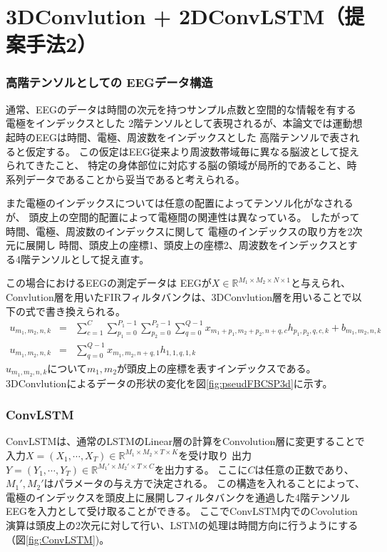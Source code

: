 \section{\rm 3DConvlution + 2DConvLSTM\mc （提案手法2）}
\subsubsection{\mc 高階テンソルとしての \rm EEG\mc データ構造}
通常、EEGのデータは時間の次元を持つサンプル点数と空間的な情報を有する電極をインデックスとした
2階テンソルとして表現されるが、本論文では運動想起時のEEGは時間、電極、周波数をインデックスとした
高階テンソルで表されると仮定する。
この仮定はEEG従来より周波数帯域毎に異なる脳波として捉えられてきたこと、
特定の身体部位に対応する脳の領域が局所的であること、時系列データであることから妥当であると考えられる。

また電極のインデックスについては任意の配置によってテンソル化がなされるが、
頭皮上の空間的配置によって電極間の関連性は異なっている。
したがって時間、電極、周波数のインデックスに関して
電極のインデックスの取り方を2次元に展開し
時間、頭皮上の座標1、頭皮上の座標2、周波数をインデックスとする4階テンソルとして捉え直す。

この場合におけるEEGの測定データは
EEGが\(X\in \mathbb R^{M_1\times M_2\times N\times 1}\)と与えられ、
Convlution層を用いたFIRフィルタバンクは、3DConvlution層を用いることで以下の式で書き換えられる。
\begin{eqnarray}
    u_{m_1,m_2,n,k}& = &\sum_{c=1}^C\sum_{p_1=0}^{P_1-1}\sum_{p_2=0}^{P_2-1}\sum_{q=0}^{Q-1} x_{m_1+p_1,m_2+p_2,n+q,c} h_{p_1,p_2,q,c,k} + b_{m_1,m_2,n,k}\\
    u_{m_1,m_2,n,k}& = &\sum_{q=0}^{Q-1} x_{m_1,m_2,n+q,1} h_{1,1,q,1,k}
    \label{eq:pseudoFIR3D}
\end{eqnarray} 
\(u_{m_1,m_2,n,k}\)について\(m_1,m_2\)が頭皮上の座標を表すインデックスである。
3DConvlutionによるデータの形状の変化を図\ref{fig:pseudFBCSP3d}に示す。


\subsubsection{\rm ConvLSTM}
ConvLSTMは、通常のLSTMのLinear層の計算をConvolution層に変更することで
入力\(X = (X_1,\cdots,X_T)\in \mathbb R^{M_1 \times M_2 \times T \times K}\)を受け取り
出力\(Y = (Y_1,\cdots,Y_T)\in \mathbb R^{M_1' \times M_2' \times T \times C}\)を出力する。
ここに\(C\)は任意の正数であり、\(M_1',M_2'\)はパラメータの与え方で決定される。
この構造を入れることによって、
電極のインデックスを頭皮上に展開しフィルタバンクを通過した4階テンソルEEGを入力として受け取ることができる。
ここでConvLSTM内でのCovolution演算は頭皮上の2次元に対して行い、LSTMの処理は時間方向に行うようにする（図\ref{fig:ConvLSTM})。

